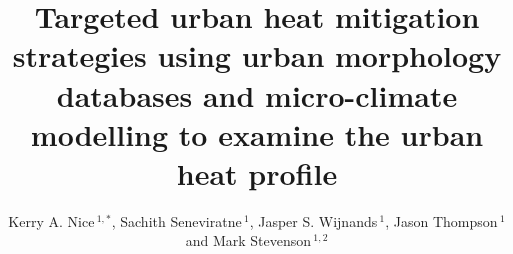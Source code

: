 \documentclass[utf8]{frontiersSCNS} %
\def\firstAuthorLast{Nice {et~al.}} %
\def\Authors{Kerry A. Nice\,$^{1,*}$, Sachith Seneviratne\,$^{1}$,
Jasper S. Wijnands\,$^{1}$, Jason Thompson\,$^{1}$ and Mark Stevenson\,$^{1,2}$}
\begin{document}
\onecolumn
{}

\title[Targeted urban heat mitigation strategies]{Targeted urban heat mitigation strategies using urban morphology databases and micro-climate modelling to examine the urban heat profile} 

\author[\firstAuthorLast ]{\Authors} %
\address{} %
\correspondance{} %

\extraAuth{}%






\maketitle
\end{document}
